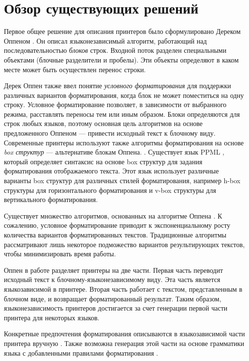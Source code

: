 \documentclass{matmex-diploma}
\begin{document}
\section{Обзор существующих решений}
Первое общее решение для описания принтеров было сформулировано Дереком Оппеном \cite{oppen}. Он описал языконезависимый алгоритм, работающий над последовательностью \textit{блоков} строк. Входной поток разделен специальными объектами (блочные разделители и пробелы). Эти объекты определяют в каком месте может быть осуществлен перенос строки.

Дерек Оппен также ввел понятие \textit{условного форматирования} для поддержки различных вариантов форматирования, когда блок не может поместиться на одну строку. Условное форматирование позволяет, в зависимости от выбранного режима, расставлять переносы тем или иным образом. Блоки определяются для строк любых языков, поэтому основная цель алгоритмов на основе предложенного Оппеном --- привести исходный текст к блочному виду. Современные принтеры используют также алгоритмы форматирования на основе \textit{box структур} --- альтернативе блокам Оппена. \cite{oppenlike:mikelsons, box:knuth}. Существует язык PPML \cite{oppenlike:morcos}, который определяет синтаксис на основе box структур для задания форматирования отображаемого текста. Этот язык использует различные варианты box структур для различных стилей форматирования, например h-box структуры для горизонтального форматирования и v-box структуры для вертикального форматирования.

Существует множество алгоритмов, основанных на алгоритме Оппена \cite{oppenlike:rose, oppenlike:mikelsons, oppenlike:rubin, oppenlike:morcos, oppenlike:brand, oppenfunc:swierstra, oppenfunc:hughes, oppenfunc:wadler}. К сожалению, условное форматирование приводит к экспоненциальному росту количества вариантов форматированных текстов. Традиционные алгоритмы рассматривают лишь некоторое подможество вариантов результирующих текстов, чтобы минимизировать время работы. 

Оппен в работе \cite{oppen} разделяет принтеры на две части. Первая часть переводит исходный текст к блочному-языконезависимому виду. Эта часть является языкозависимой в принтере. Вторая часть работает с текстом, представленным в блочном виде, и возвращает форматированный результат. Таким образом, языконезависимость принтеров достигается за счет генерации первой части принтера для некоторых языков.

Конкретные предпочтения форматирования описываются в языкозависимой части принтера вручную \cite{jokinen, oppenlike:morcos}. Также возможна генерация этой части на основе грамматики языка с добавленными правилами форматирования \cite{boulton, oppenlike:rose, oppenlike:rubin}.
\end{document}
